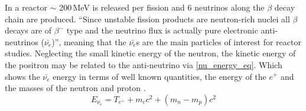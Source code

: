 In a reactor $\sim$ 200\,MeV is released per fission and 6 neutrinos along the $\beta$ decay chain are produced. ``Since unstable fission products are neutron-rich nuclei all $\beta$ decays are of $\beta^-$ type and the neutrino flux is actually pure electronic anti-neutrinos ($\bar{\nu_e}$)''\cite{Mueller_2011}, meaning that the $\bar{\nu_e}$s are the main particles of interest for reactor studies. Neglecting the small kinetic energy of the neutron, the kinetic energy of the positron may be related to the anti-neutrino via \ref{nu_energy_eq}. Which shows the $\bar{\nu_e}$ energy in terms of well known quantities, the energy of the $e^+$ and the masses of the neutron and proton \cite{Vogel_1999}. 
\begin{equation}
 E_{\bar{\nu_e}} = T_{e^+} + m_{e}c^2 + (m_n - m_p)c^2  %
\label{nu_energy_eq}
\end{equation}


